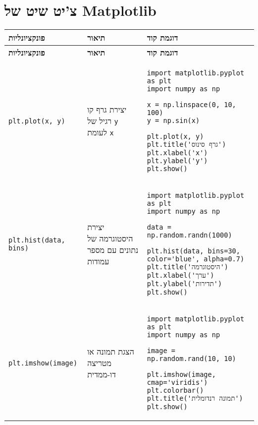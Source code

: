 \documentclass[a4paper, 12pt]{article}
\begin{document}
\section*{צ'יט שיט של Matplotlib}

\begin{longtable}{|p{}|p{}|p{}|}
\hline
\textbf{פונקציונליות} & \textbf{תיאור} & \textbf{דוגמת קוד} \\
\hline
\endfirsthead
\hline
\textbf{פונקציונליות} & \textbf{תיאור} & \textbf{דוגמת קוד} \\
\hline
\endhead
\hline
\endfoot

\hline
\endlastfoot

\textenglish{\texttt{plt.plot(x, y)}} & יצירת גרף קו רגיל של \textenglish{\texttt{y}} לעומת \textenglish{\texttt{x}} & 
\begin{verbatim}
import matplotlib.pyplot as plt
import numpy as np

x = np.linspace(0, 10, 100)
y = np.sin(x)

plt.plot(x, y)
plt.title('גרף סינוס')
plt.xlabel('x')
plt.ylabel('y')
plt.show()
\end{verbatim} \\

\hline

\textenglish{\texttt{plt.hist(data, bins)}} & יצירת היסטוגרמה של נתונים עם מספר עמודות & 
\begin{verbatim}
import matplotlib.pyplot as plt
import numpy as np

data = np.random.randn(1000)

plt.hist(data, bins=30, color='blue', alpha=0.7)
plt.title('היסטוגרמה')
plt.xlabel('ערך')
plt.ylabel('תדירות')
plt.show()
\end{verbatim} \\

\hline

\textenglish{\texttt{plt.imshow(image)}} & הצגת תמונה או מטריצה דו-ממדית & 
\begin{verbatim}
import matplotlib.pyplot as plt
import numpy as np

image = np.random.rand(10, 10)

plt.imshow(image, cmap='viridis')
plt.colorbar()
plt.title('תמונה רנדומלית')
plt.show()
\end{verbatim} \\

\end{longtable}
\end{document}
